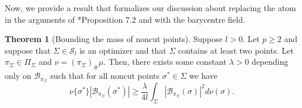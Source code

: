 \documentclass[preprint, reqno]{amsart}
\theoremstyle{definition}
\newtheorem{theorem}[definition]{Theorem}
\numberwithin{equation}{section}
\begin{document}
Now, we provide a result that formalizes our discussion about
replacing the atom in the arguments of \cite{Buttazzo03}*{Proposition
  7.2} and \cite[Theorem 5.5]{Stepanov06} with the barycentre field.
\begin{theorem}[Bounding the mass of noncut
  points]\label{prop:boundingmassofnoncutpoints} Suppose $l > 0$.
  Let $p \geq 2$ and suppose that $\Sigma \in \mathcal{S}_l$ is an
  optimizer and that $\Sigma$ contains at least two points. Let
  $\pi_\Sigma \in \Pi_\Sigma$ and $\nu = (\pi_{\Sigma})_{\#}\mu$.
  Then, there exists some constant $\lambda > 0$ depending only on
  $\mathcal B_{\pi_\Sigma}$ such that for all noncut points $\sigma^*
  \in \Sigma$ we have
  \[
    \nu\{\sigma^*\}|\mathcal{B}_{\pi_{\Sigma}}(\sigma^*)| \geq
    \frac{\lambda }{4l} \int_{\Sigma}
    |\mathcal{B}_{\pi_{\Sigma}}(\sigma)|^2 d\nu(\sigma).
  \]
\end{theorem}
\end{document}
